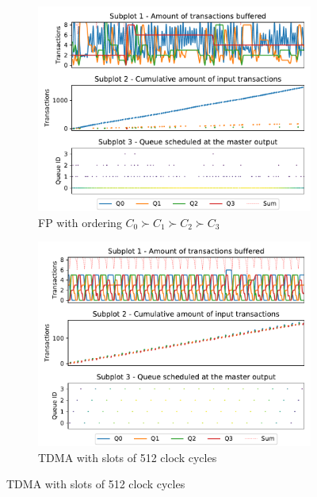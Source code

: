     \begin{figure}[]
      \centering
      \begin{subfigure}{0.45\textwidth}
        \centering
        \includegraphics[scale=0.45]{images/SchIM_FP_buffering.pdf}
        \caption{FP with ordering $C_{0} \succ C_{1} \succ C_{2} \succ C_{3}$}
        \label{fig:schim_behaviour_fp}
      \end{subfigure}
      \hfill
      \begin{subfigure}{0.45\textwidth}
        \centering
        \includegraphics[scale=0.45]{images/SchIM_TDMA_buffering.pdf}
        \caption{TDMA with slots of 512 clock cycles}
        \label{fig:schim_behaviour_tdma}

\end{subfigure}
\end{figure}
